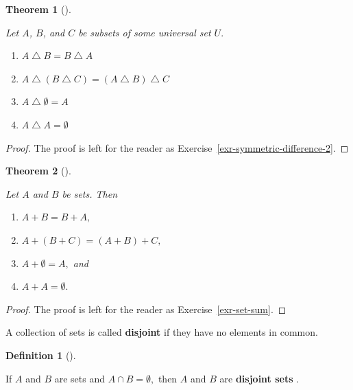 \documentclass[
  letterpaper,
  10pt,
  reqno,
  twopage,
  openany]{book}
\providecommand{\tightlist}{%
  \setlength{\itemsep}{0pt}\setlength{\parskip}{0pt}}\usepackage{longtable,booktabs,array}
\theoremstyle{plain}
\theoremstyle{definition}
\theoremstyle{definition}
\newtheorem{definition}{Definition}[chapter]
\theoremstyle{definition}
\theoremstyle{plain}
\theoremstyle{plain}
\newtheorem{theorem}{Theorem}[chapter]
\theoremstyle{remark}
\begin{document}
\leavevmode{}%
\begin{theorem}[]\label{thm-symmetric-difference-2}

Let \(A\), \(B\), and \(C\) be subsets of some universal set \(U.\)

\begin{enumerate}
\def\labelenumi{\arabic{enumi}.}
\tightlist
\item
  \(A\bigtriangleup B=B\bigtriangleup A\)
\item
  \(A\bigtriangleup (B\bigtriangleup C)=(A\bigtriangleup B)\bigtriangleup C\)
\item
  \(A\bigtriangleup \emptyset = A\)
\item
  \(A\bigtriangleup A=\emptyset\)
\end{enumerate}

\end{theorem}

\begin{proof}

The proof is left for the reader as
Exercise~\ref{exr-symmetric-difference-2}.

\end{proof}

\leavevmode{}%
\begin{theorem}[]\label{thm-set-sum}

Let \(A\) and \(B\) be sets. Then

\begin{enumerate}
\def\labelenumi{\arabic{enumi}.}
\tightlist
\item
  \(A+B=B+A,\)
\item
  \(A+(B+C)=(A+B)+C,\)
\item
  \(A+\emptyset = A,\) and
\item
  \(A+A=\emptyset .\)
\end{enumerate}

\end{theorem}

\begin{proof}

The proof is left for the reader as Exercise~\ref{exr-set-sum}.

\end{proof}

A collection of sets is called  \textbf{disjoint} if
they have no elements in common.

\leavevmode{}%
\begin{definition}[]\label{def-disjoint}

If \(A\) and \(B\) are sets and \(A\cap B=\emptyset,\) then \(A\) and
\(B\) are  \textbf{disjoint sets} .

\end{definition}
\end{document}
